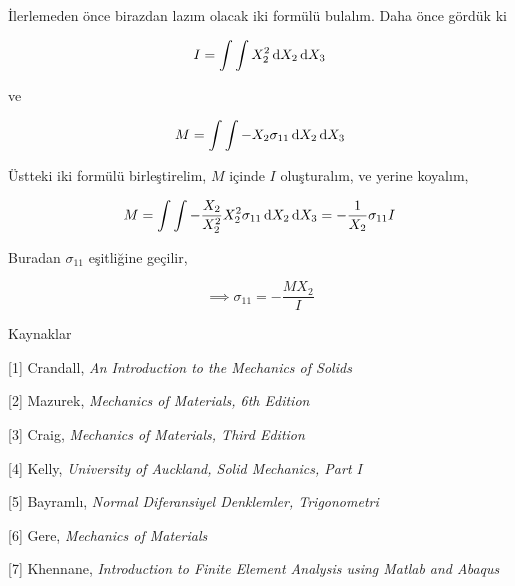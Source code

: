 \documentclass[12pt,fleqn]{article}\usepackage{../../common}
\begin{document}
İlerlemeden önce birazdan lazım olacak iki formülü bulalım. Daha önce gördük ki

$$
I = \int \int X_2^2 \,\mathrm{d} X_2 \,\mathrm{d} X_3
$$

ve

$$
M = \int \int -X_2 \sigma_{11} \,\mathrm{d} X_2 \,\mathrm{d} X_3
$$

Üstteki iki formülü birleştirelim, $M$ içinde $I$ oluşturalım, ve yerine koyalım,

$$
M = \int \int -\frac{X_2}{X_2^2} X_2^2 \sigma_{11} \,\mathrm{d} X_2 \,\mathrm{d} X_3 =
-\frac{1}{X_2} \sigma_{11} I 
$$

Buradan $\sigma_{11}$ eşitliğine geçilir,

$$
\implies \sigma_{11} = -\frac{M X_2}{I}
$$

Kaynaklar

[1] Crandall, {\em An Introduction to the Mechanics of Solids}

[2] Mazurek, {\em Mechanics of Materials, 6th Edition}

[3] Craig, {\em Mechanics of Materials, Third Edition}

[4] Kelly, {\em University of Auckland, Solid Mechanics, Part I}

[5] Bayramlı, {\em Normal Diferansiyel Denklemler, Trigonometri}

[6] Gere, {\em Mechanics of Materials}

[7] Khennane, {\em Introduction to Finite Element Analysis using Matlab and Abaqus}
\end{document}
